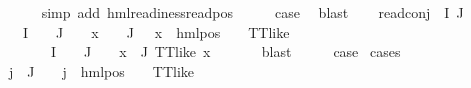 \begin{isabellebody}
\ \ \ \ \isamarkupfalse%
\ {\isacharparenleft}{\kern0pt}simp\ add{\isacharcolon}{\kern0pt}\ hml{\isacharunderscore}{\kern0pt}readiness{\isachardot}{\kern0pt}read{\isacharunderscore}{\kern0pt}pos{\isacharparenright}{\kern0pt}\isanewline
\ \ \isamarkupfalse%
\ \isamarkupfalse%
\ {\isacharquery}{\kern0pt}case\ \isamarkupfalse%
\ blast\isanewline
{}\isamarkupfalse%
\isanewline
\ \ \isamarkupfalse%
\ {\isacharparenleft}{\kern0pt}read{\isacharunderscore}{\kern0pt}conj\ {\isasymPhi}\ I\ J{\isacharparenright}{\kern0pt}\isanewline
\ \ \isamarkupfalse%
\ \isamarkupfalse%
\ {\isachardoublequoteopen}{\isasymPhi}\ {\isacharbackquote}{\kern0pt}\ I\ {\isasyminter}\ {\isasymPhi}\ {\isacharbackquote}{\kern0pt}\ J\ {\isacharequal}{\kern0pt}\ {\isacharbraceleft}{\kern0pt}{\isacharbraceright}{\kern0pt}\ {\isasymand}\ {\isacharparenleft}{\kern0pt}{\isasymforall}x\ {\isasymin}\ {\isacharparenleft}{\kern0pt}{\isasymPhi}\ {\isacharbackquote}{\kern0pt}\ J{\isacharparenright}{\kern0pt}{\isachardot}{\kern0pt}\ {\isacharparenleft}{\kern0pt}{\isasymexists}{\isasymalpha}\ {\isasymchi}{\isachardot}{\kern0pt}\ x\ {\isacharequal}{\kern0pt}\ hml{\isacharunderscore}{\kern0pt}pos\ {\isasymalpha}\ {\isasymchi}\ {\isasymand}\ TT{\isacharunderscore}{\kern0pt}like\ {\isasymchi}{\isacharparenright}{\kern0pt}{\isacharparenright}{\kern0pt}{\isachardoublequoteclose}\isanewline
\ \ \ \ {\isacharbar}{\kern0pt}\ {\isachardoublequoteopen}{\isasymPhi}\ {\isacharbackquote}{\kern0pt}\ I\ {\isasyminter}\ {\isasymPhi}\ {\isacharbackquote}{\kern0pt}\ J\ {\isasymnoteq}\ {\isacharbraceleft}{\kern0pt}{\isacharbraceright}{\kern0pt}\ {\isasymor}\ {\isacharparenleft}{\kern0pt}{\isasymexists}x\ {\isasymin}{\isasymPhi}{\isacharbackquote}{\kern0pt}\ J{\isachardot}{\kern0pt}\ {\isacharparenleft}{\kern0pt}TT{\isacharunderscore}{\kern0pt}like\ x{\isacharparenright}{\kern0pt}{\isacharparenright}{\kern0pt}{\isachardoublequoteclose}\ \isanewline
\ \ \ \ \isamarkupfalse%
\ blast\isanewline
\ \ \isamarkupfalse%
\ \isamarkupfalse%
\ {\isacharquery}{\kern0pt}case\ \isamarkupfalse%
{\isacharparenleft}{\kern0pt}cases{\isacharparenright}{\kern0pt}\isanewline
\ \ \ \ \isamarkupfalse%
\ {}\isanewline
\ \ \ \ \isamarkupfalse%
\ {\isachardoublequoteopen}{\isasymforall}j\ {\isasymin}\ J{\isachardot}{\kern0pt}\ {\isacharparenleft}{\kern0pt}{\isasymexists}{\isasymalpha}\ {\isasymchi}{\isachardot}{\kern0pt}\ {\isasymPhi}\ j\ {\isacharequal}{\kern0pt}\ hml{\isacharunderscore}{\kern0pt}pos\ {\isasymalpha}\ {\isasymchi}\ {\isasymand}\ TT{\isacharunderscore}{\kern0pt}like\ {\isasymchi}{\isacharparenright}{\kern0pt}{\isachardoublequoteclose}\ \isanewline

\end{isabellebody}
